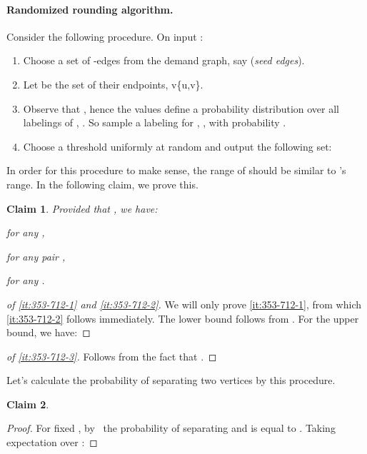\documentclass{article}
\newtheorem{claim}{Claim}[section]
\newcounter{alg-count}
\newcommand{\sde}{{\mathcal{S}}}
\begin{document}
\paragraph{Randomized rounding algorithm.} 
Consider the following procedure.
On input :
\begin{enumerate}
\item Choose a set of -edges from the demand graph, say  ({\em seed edges}).
\item Let  be the set of their endpoints, v\{u,v\}\in \sde.
\item Observe that , hence the values
   define a probability distribution over
  all labelings of ,  .  So sample a labeling
  for , , with probability
  .
\item Choose a threshold  uniformly at random and
  output the following set:

\end{enumerate}
In order for this procedure to make sense, the range of 
should be similar to 's range. In the following claim, we prove
this.
\begin{claim} \label{clm:tau-ulb}
Provided that , we have:
\begin{inparaenum}[(i)]
\item \label{it:353-712-1}  for any ,
\item \label{it:353-712-2}  for any
  pair ,
\item \label{it:353-712-3}  for any .
\end{inparaenum}
\end{claim}
\begin{proof}[of \eqref{it:353-712-1} and \eqref{it:353-712-2}]
  We will only prove \eqref{it:353-712-1}, from which
  \eqref{it:353-712-2} follows immediately.  The lower bound follows
  from . For the upper bound, we
  have:
 
\end{proof}
\begin{proof}[of \eqref{it:353-712-3}]
  Follows from the fact that .
\end{proof}
Let's calculate the probability of separating two vertices 
by this procedure.
\begin{claim}\label{clm:sep-prob}
  
\end{claim}
\begin{proof}
  For fixed , by~ the probability of separating
   and  is equal to .
Taking expectation over :

\end{proof}
\end{document}
